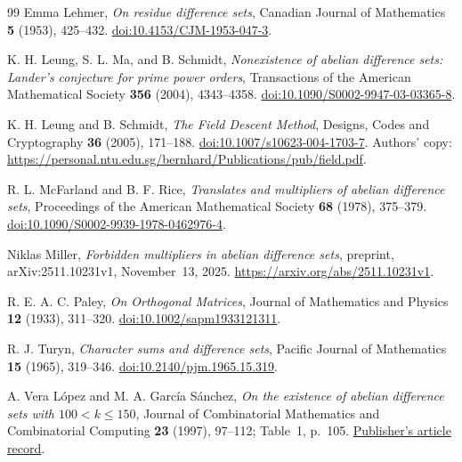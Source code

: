 \documentclass[11pt]{article}
\begin{document}
\begin{thebibliography}{99}
Emma Lehmer,
\emph{On residue difference sets},
Canadian Journal of Mathematics \textbf{5} (1953), 425--432.
\href{https://doi.org/10.4153/CJM-1953-047-3}{doi:10.4153/CJM-1953-047-3}.

K. H. Leung, S. L. Ma, and B. Schmidt,
\emph{Nonexistence of abelian difference sets: Lander's conjecture
for prime power orders},
Transactions of the American Mathematical Society
\textbf{356} (2004), 4343--4358.
\href{https://doi.org/10.1090/S0002-9947-03-03365-8}{doi:10.1090/S0002-9947-03-03365-8}.

K. H. Leung and B. Schmidt,
\emph{The Field Descent Method},
Designs, Codes and Cryptography \textbf{36} (2005), 171--188.
\href{https://doi.org/10.1007/s10623-004-1703-7}{doi:10.1007/s10623-004-1703-7}.
Authors' copy:
\url{https://personal.ntu.edu.sg/bernhard/Publications/pub/field.pdf}.

R. L. McFarland and B. F. Rice,
\emph{Translates and multipliers of abelian difference sets},
Proceedings of the American Mathematical Society
\textbf{68} (1978), 375--379.
\href{https://doi.org/10.1090/S0002-9939-1978-0462976-4}{doi:10.1090/S0002-9939-1978-0462976-4}.

Niklas Miller,
\emph{Forbidden multipliers in abelian difference sets},
preprint, arXiv:2511.10231v1, November~13, 2025.
\url{https://arxiv.org/abs/2511.10231v1}.

R. E. A. C. Paley,
\emph{On Orthogonal Matrices},
Journal of Mathematics and Physics \textbf{12} (1933), 311--320.
\href{https://doi.org/10.1002/sapm1933121311}{doi:10.1002/sapm1933121311}.

R. J. Turyn,
\emph{Character sums and difference sets},
Pacific Journal of Mathematics \textbf{15} (1965), 319--346.
\href{https://doi.org/10.2140/pjm.1965.15.319}{doi:10.2140/pjm.1965.15.319}.

A. Vera L\'opez and M. A. Garc\'ia S\'anchez,
\emph{On the existence of abelian difference sets with $100<k\leq150$},
Journal of Combinatorial Mathematics and Combinatorial Computing
\textbf{23} (1997), 97--112; Table~1, p.~105.
\href{https://combinatorialpress.com/jcmcc-articles/volume-023/on-the-existence-of-abelian-difference-sets-with-100-k-leq-150/}{Publisher's article record}.

\end{thebibliography}
\end{document}
